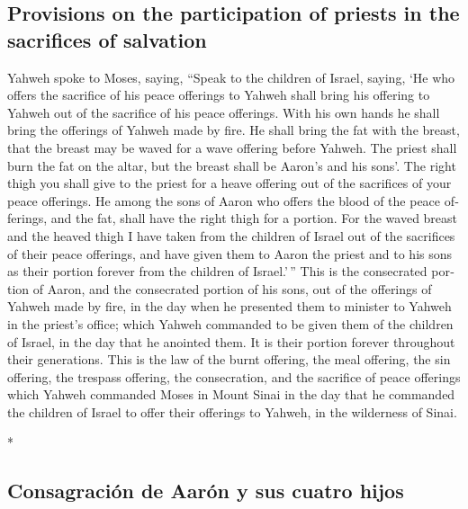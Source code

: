 \begin{paracol}{2}
\begin{otherlanguage}{english}
\hypertarget{provisions-on-the-participation-of-priests-in-the-sacrifices-of-salvation}{%
\subsection{Provisions on the participation of priests in the sacrifices
of
salvation}\label{provisions-on-the-participation-of-priests-in-the-sacrifices-of-salvation}}

 Yahweh spoke to Moses, saying,  ``Speak
to the children of Israel, saying, `He who offers the sacrifice of his
peace offerings to Yahweh shall bring his offering to Yahweh out of the
sacrifice of his peace offerings.  With his own hands he
shall bring the offerings of Yahweh made by fire. He shall bring the fat
with the breast, that the breast may be waved for a wave offering before
Yahweh.  The priest shall burn the fat on the altar, but
the breast shall be Aaron's and his sons'.  The right
thigh you shall give to the priest for a heave offering out of the
sacrifices of your peace offerings.  He among the sons of
Aaron who offers the blood of the peace offerings, and the fat, shall
have the right thigh for a portion.  For the waved breast
and the heaved thigh I have taken from the children of Israel out of the
sacrifices of their peace offerings, and have given them to Aaron the
priest and to his sons as their portion forever from the children of
Israel.'\,''  This is the consecrated portion of Aaron,
and the consecrated portion of his sons, out of the offerings of Yahweh
made by fire, in the day when he presented them to minister to Yahweh in
the priest's office;  which Yahweh commanded to be given
them of the children of Israel, in the day that he anointed them. It is
their portion forever throughout their generations.  This
is the law of the burnt offering, the meal offering, the sin offering,
the trespass offering, the consecration, and the sacrifice of peace
offerings  which Yahweh commanded Moses in Mount Sinai in
the day that he commanded the children of Israel to offer their
offerings to Yahweh, in the wilderness of Sinai.

\end{otherlanguage}

\switchcolumn[0]*

\hypertarget{consagraciuxf3n-de-aaruxf3n-y-sus-cuatro-hijos}{%
\subsection{Consagración de Aarón y sus cuatro
hijos}\label{consagraciuxf3n-de-aaruxf3n-y-sus-cuatro-hijos}}


\end{paracol}
